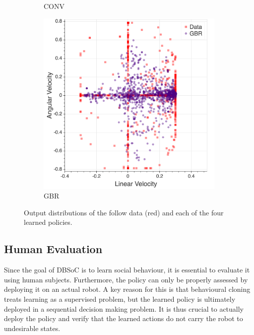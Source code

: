 \documentclass[letterpaper, 10 pt, conference]{ieeeconf}
\begin{document}
\begin{figure}[tbh]
\begin{subfigure}[b]{0.45\columnwidth}
    \caption{CONV}
    \label{fig:data3}
  \end{subfigure}
  \hspace{5mm}
  \begin{subfigure}[b]{0.45\columnwidth}
    \includegraphics[scale = 0.08]{images/gbr_dist.png}

    \caption{GBR}
       \label{fig:data4}
  \end{subfigure} 
  \caption{Output distributions of the follow data (red) and each of the four learned policies.}

  \label{fig:data}
  \end{figure}


\subsection{Human Evaluation}
Since the goal of DBSoC is to learn social behaviour, it is essential to evaluate it using human subjects.  Furthermore, the policy can only be properly assessed by deploying it on an actual robot.  A key reason for this is that behavioural cloning treats learning as a supervised problem, but the learned policy is ultimately deployed in a sequential decision making problem. It is thus crucial to actually deploy the policy and verify that the learned actions do not carry the robot to undesirable states.
\end{document}
